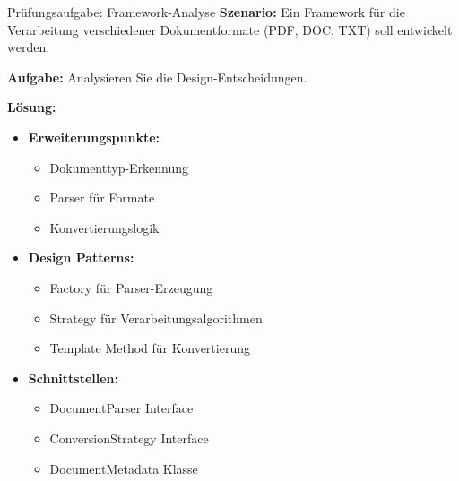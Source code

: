 \begin{example}{Prüfungsaufgabe: Framework-Analyse}
\textbf{Szenario:}
Ein Framework für die Verarbeitung verschiedener Dokumentformate (PDF, DOC, TXT) 
soll entwickelt werden.

\textbf{Aufgabe:}
Analysieren Sie die Design-Entscheidungen.

\textbf{Lösung:}
\begin{itemize}
    \item \textbf{Erweiterungspunkte:}
    \begin{itemize}
        \item Dokumenttyp-Erkennung
        \item Parser für Formate
        \item Konvertierungslogik
    \end{itemize}
    
    \item \textbf{Design Patterns:}
    \begin{itemize}
        \item Factory für Parser-Erzeugung
        \item Strategy für Verarbeitungsalgorithmen
        \item Template Method für Konvertierung
    \end{itemize}
    
    \item \textbf{Schnittstellen:}
    \begin{itemize}
        \item DocumentParser Interface
        \item ConversionStrategy Interface
        \item DocumentMetadata Klasse
    \end{itemize}
\end{itemize}
\end{example}

